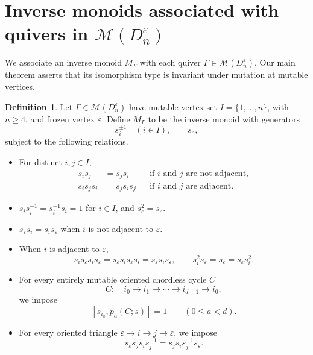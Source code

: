 \documentclass[a4paper, 12pt, reqno]{amsart}
\theoremstyle{definition}
\newtheorem{definition}[theorem]{Definition}
\newcommand{\eps}{\varepsilon}
\begin{document}
\section{Inverse monoids associated with quivers in $\mathcal{M}(D_n^{\varepsilon})$}\label{monoids and diagrams}

We associate an inverse monoid $M_{\Gamma}$ with each quiver $\Gamma\in\mathcal{M}(D_n^{\varepsilon})$. Our main theorem asserts that its isomorphism type is invariant under mutation at mutable vertices.

\begin{definition}\label{def:B-inverse-monoid}
Let $\Gamma\in\mathcal{M}(D_n^{\varepsilon})$ have mutable vertex set $I=\{1,\ldots,n\}$, with $n\geq 4$, and frozen vertex $\varepsilon$. Define $M_{\Gamma}$ to be the inverse monoid with generators
\[
s_i^{\pm1}\quad(i\in I),\qquad s_{\varepsilon},
\]
subject to the following relations.

\begin{itemize}
\item[(R1)] For distinct $i,j\in I$,
\[
\begin{aligned}
s_is_j&=s_js_i
&&\text{if $i$ and $j$ are not adjacent},\\
s_is_js_i&=s_js_is_j
&&\text{if $i$ and $j$ are adjacent}.
\end{aligned}
\]

\item[(R2)] $s_is_i^{-1}=s_i^{-1}s_i=1$ for $i\in I$, and $s_\eps^2=s_\eps$.

\item[(R3)] $s_\eps s_i=s_is_\eps$ when $i$ is not adjacent to $\eps$.

\item[(R4)] When $i$ is adjacent to $\eps$,
\[
s_is_\eps s_is_\eps=s_\eps s_is_\eps s_i=s_\eps s_is_\eps,
\qquad s_i^2s_\eps=s_\eps=s_\eps s_i^2.
\]

\item[(R5)] For every entirely mutable oriented chordless cycle $C$
\[
C:\quad i_0\longrightarrow i_1\longrightarrow\cdots \longrightarrow i_{d-1}\longrightarrow i_0,
\]
we impose
\[
[s_{i_a},p_a(C;s)]=1 \qquad(0\leq a<d).
\]


\item[(R6)] For every oriented triangle $\varepsilon\longrightarrow i\longrightarrow j\longrightarrow\varepsilon$, we impose
\[
s_{\varepsilon}s_js_is_j^{-1} = s_js_is_j^{-1}s_{\varepsilon}.
\]


\end{itemize}
\end{definition}
\end{document}
